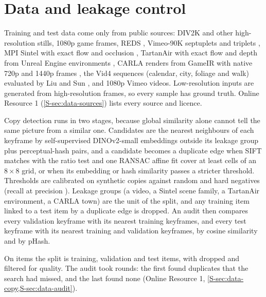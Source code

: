 \documentclass[pdflatex,sn-mathphys-num,iicol]{sn-jnl}
\begin{document}
\section{Data and leakage control}\label{sec:data}

Training and test data come only from public sources: DIV2K \cite{agustsson2017div2k} and other high-resolution stills, 1080p game frames, REDS \cite{nah2019reds}, Vimeo-90K septuplets and triplets \cite{xue2019vimeo}, MPI Sintel with exact flow and occlusion \cite{butler2012sintel}, TartanAir with exact flow and depth from Unreal Engine environments \cite{wang2020tartanair}, CARLA \cite{dosovitskiy2017carla} renders from GameIR with native 720p and 1440p frames \cite{zhou2024gameir}, the Vid4 sequences (calendar, city, foliage and walk) evaluated by Liu and Sun \cite{liu2014vid4}, and 1080p Vimeo videos. Low-resolution inputs are generated from high-resolution frames, so every sample has ground truth. Online Resource 1 (\cref{S-sec:data-sources}) lists every source and licence.

Copy detection runs in two stages, because global similarity alone cannot tell the same picture from a similar one. Candidates are the  nearest neighbours of each keyframe by self-supervised DINOv2-small embeddings outside its leakage group plus perceptual-hash pairs, and a candidate becomes a duplicate edge when SIFT matches \cite{lowe2004sift} with the ratio test and one RANSAC affine fit \cite{fischler1981ransac} cover at least  cells of an $8\times8$ grid, or when its embedding or hash similarity passes a stricter threshold. Thresholds are calibrated on  synthetic copies against  random and  hard negatives (recall  at precision ). Leakage groups (a video, a Sintel scene family, a TartanAir environment, a CARLA town) are the unit of the split, and any training item linked to a test item by a duplicate edge is dropped. An audit then compares every validation keyframe with its  nearest training keyframes, and every test keyframe with its nearest training and validation keyframes, by cosine similarity and by pHash.

On  items the split is  training,  validation and  test items, with  dropped and  filtered for quality. The audit took  rounds: the first found duplicates that the search had missed, and the last found none (Online Resource 1, \cref{S-sec:data-copy,S-sec:data-audit}).
\end{document}
